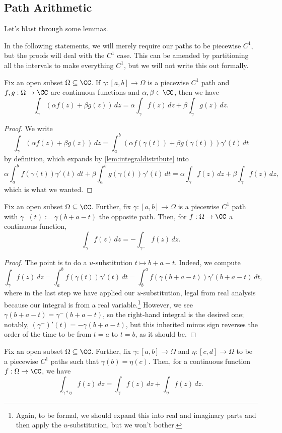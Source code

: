 \subsection{Path Arithmetic}
Let's blast through some lemmas.
\begin{warn}
	In the following statements, we will merely require our paths to be piecewise $C^1$, but the proofs will deal with the $C^1$ case. This can be amended by partitioning all the intervals to make everything $C^1$, but we will not write this out formally.
\end{warn}
\begin{lemma}
	Fix an open subset $\Omega\subseteq\CC$. If $\gamma:[a,b]\to\Omega$ is a piecewise $C^1$ path and $f,g:\Omega\to\CC$ are continuous functions and $\alpha,\beta\in\CC$, then we have
	\[\int_\gamma(\alpha f(z)+\beta g(z))\,dz=\alpha\int_\gamma f(z)\,dz+\beta\int_\gamma g(z)\,dz.\]
\end{lemma}
\begin{proof}
	We write
	\[\int_\gamma(\alpha f(z)+\beta g(z))\,dz=\int_a^b(\alpha f(\gamma(t))+\beta g(\gamma(t)))\gamma'(t)\,dt\]
	by definition, which expands by \autoref{lem:integraldistribute} into
	\[\alpha\int_a^bf(\gamma(t))\gamma'(t)\,dt+\beta\int_a^bg(\gamma(t))\gamma'(t)\,dt=\alpha\int_\gamma f(z)\,dz+\beta\int_\gamma f(z)\,dz,\]
	which is what we wanted.
\end{proof}
\begin{lemma}
	Fix an open subset $\Omega\subseteq\CC$. Further, fix $\gamma:[a,b]\to\Omega$ is a piecewise $C^1$ path with $\gamma^-(t):=\gamma(b+a-t)$ the opposite path. Then, for $f:\Omega\to\CC$ a continuous function,
	\[\int_\gamma f(z)\,dz=-\int_{\gamma^-}f(z)\,dz.\]
\end{lemma}
\begin{proof}
	The point is to do a $u$-substitution $t\mapsto b+a-t$. Indeed, we compute
	\[\int_\gamma f(z)\,dz=\int_a^bf(\gamma(t))\gamma'(t)\,dt=\int_b^af(\gamma(b+a-t))\gamma'(b+a-t)\,dt,\]
	where in the last step we have applied our $u$-substitution, legal from real analysis because our integral is from a real variable.\footnote{Again, to be formal, we should expand this into real and imaginary parts and then apply the $u$-substitution, but we won't bother.} However, we see $\gamma(b+a-t)=\gamma^-(b+a-t)$, so the right-hand integral is the desired one; notably, $(\gamma^-)'(t)=-\gamma(b+a-t)$, but this inherited minus sign reverses the order of the time to be from $t=a$ to $t=b$, as it should be.
\end{proof}
\begin{lemma}
	Fix an open subset $\Omega\subseteq\CC$. Further, fix $\gamma:[a,b]\to\Omega$ and $\eta:[c,d]\to\Omega$ to be a piecewise $C^1$ paths such that $\gamma(b)=\eta(c)$. Then, for a continuous function $f:\Omega\to\CC$, we have
	\[\int_{\gamma*\eta}f(z)\,dz=\int_\gamma f(z)\,dz+\int_\eta f(z)\,dz.\]
\end{lemma}
